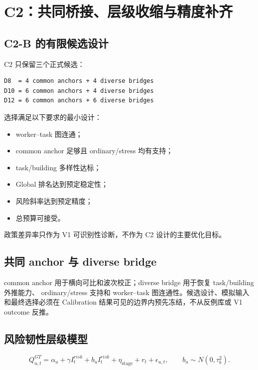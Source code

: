 \section{C2：共同桥接、层级收缩与精度补齐}

\subsection{C2-B 的有限候选设计}

C2 只保留三个正式候选：

\begin{verbatim}
D8  = 4 common anchors + 4 diverse bridges
D10 = 6 common anchors + 4 diverse bridges
D12 = 6 common anchors + 6 diverse bridges
\end{verbatim}

选择满足以下要求的最小设计：
\begin{itemize}
  \item worker--task 图连通；
  \item common anchor 足够且 ordinary/stress 均有支持；
  \item task/building 多样性达标；
  \item Global 排名达到预定稳定性；
  \item 风险斜率达到预定精度；
  \item 总预算可接受。
\end{itemize}

政策差异率只作为 V1 可识别性诊断，不作为 C2 设计的主要优化目标。

\subsection{共同 anchor 与 diverse bridge}

common anchor 用于横向可比和波次校正；diverse bridge 用于恢复 task/building 外推能力、
ordinary/stress 支持和 worker--task 图连通性。候选设计、模拟输入和最终选择必须在
Calibration 结果可见的边界内预先冻结，不从反例库或 V1 outcome 反推。

\subsection{风险韧性层级模型}

\[
Q^{GT}_{u,t}=\alpha_u+\gamma I_t^{risk}
+b_uI_t^{risk}+\eta_{\mathrm{stage}}+r_t+\epsilon_{u,t},
\qquad b_u\sim N(0,\tau_b^2).
\]

